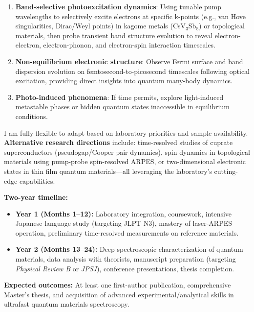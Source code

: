\documentclass[11pt,a4paper]{article}
\begin{document}
\begin{enumerate}
    \item \textbf{Band-selective photoexcitation dynamics}: Using tunable pump wavelengths to selectively excite electrons at specific k-points (e.g., van Hove singularities, Dirac/Weyl points) in kagome metals (CsV$_3$Sb$_5$) or topological materials, then probe transient band structure evolution to reveal electron-electron, electron-phonon, and electron-spin interaction timescales.
    
    \item \textbf{Non-equilibrium electronic structure}: Observe Fermi surface and band dispersion evolution on femtosecond-to-picosecond timescales following optical excitation, providing direct insights into quantum many-body dynamics.
    
    \item \textbf{Photo-induced phenomena}: If time permits, explore light-induced metastable phases or hidden quantum states inaccessible in equilibrium conditions.
\end{enumerate}

I am fully flexible to adapt based on laboratory priorities and sample availability. \textbf{Alternative research directions} include: time-resolved studies of cuprate superconductors (pseudogap/Cooper pair dynamics), spin dynamics in topological materials using pump-probe spin-resolved ARPES, or two-dimensional electronic states in thin film quantum materials—all leveraging the laboratory's cutting-edge capabilities.

\textbf{Two-year timeline:}
\begin{itemize}
    \item \textbf{Year 1 (Months 1--12):} Laboratory integration, coursework, intensive Japanese language study (targeting JLPT N3), mastery of laser-ARPES operation, preliminary time-resolved measurements on reference materials.
    \item \textbf{Year 2 (Months 13--24):} Deep spectroscopic characterization of quantum materials, data analysis with theorists, manuscript preparation (targeting \textit{Physical Review B} or \textit{JPSJ}), conference presentations, thesis completion.
\end{itemize}

\textbf{Expected outcomes:} At least one first-author publication, comprehensive Master's thesis, and acquisition of advanced experimental/analytical skills in ultrafast quantum materials spectroscopy.
\end{document}
